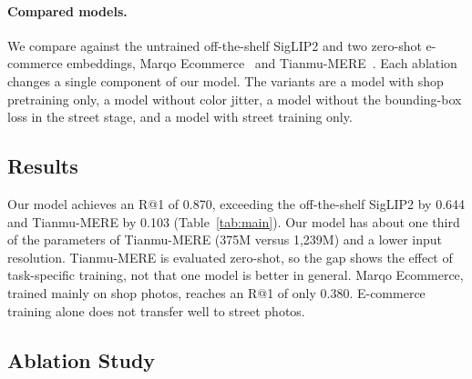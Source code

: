 \documentclass[sigconf,nonacm]{acmart}
\begin{document}
\paragraph{Compared models.} We compare against the untrained off-the-shelf SigLIP2 and two zero-shot e-commerce embeddings, Marqo Ecommerce~\cite{marqo2024} and Tianmu-MERE~\cite{tianmu}. Each ablation changes a single component of our model. The variants are a model with shop pretraining only, a model without color jitter, a model without the bounding-box loss in the street stage, and a model with street training only.

\subsection{Results}
\label{sec:results}

\begin{table}[tb]
  \caption{Comparison with existing models.}
  \label{tab:main}
  \small
\end{table}

Our model achieves an R@1 of 0.870, exceeding the off-the-shelf SigLIP2 by 0.644 and Tianmu-MERE by 0.103 (Table~\ref{tab:main}). Our model has about one third of the parameters of Tianmu-MERE (375M versus 1,239M) and a lower input resolution. Tianmu-MERE is evaluated zero-shot, so the gap shows the effect of task-specific training, not that one model is better in general. Marqo Ecommerce, trained mainly on shop photos, reaches an R@1 of only 0.380. E-commerce training alone does not transfer well to street photos.

\subsection{Ablation Study}
\label{sec:ablation}
\end{document}
